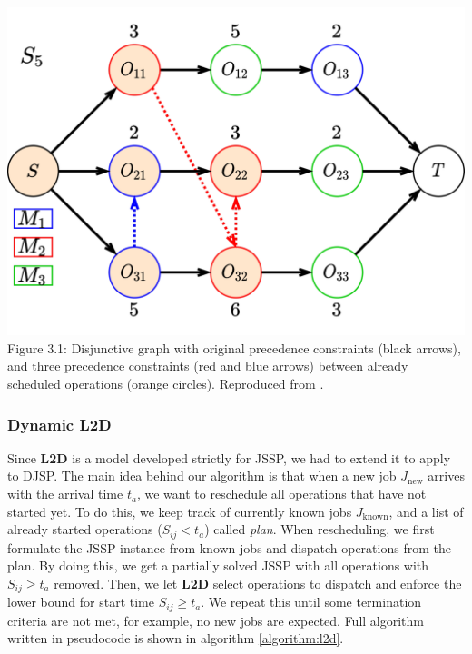 \begin{center}
    \includegraphics[width=0.75\linewidth]{images/jssp_adding_arcs.pdf}\\
    Figure 3.1: Disjunctive graph with original precedence constraints (black arrows), and three precedence constraints (red and blue arrows) between already scheduled operations (orange circles). Reproduced from \cite{zhang2020learning}.
\end{center}

\subsubsection{Dynamic L2D}

Since \textbf{L2D} is a model developed strictly for JSSP, we had to extend it to apply to DJSP. The main idea behind our algorithm is that when a new job $J_\text{new}$ arrives with the arrival time $t_a$, we want to reschedule all operations that have not started yet. To do this, we keep track of currently known jobs $J_\text{known}$, and a list of already started operations ($S_{ij} < t_a$) called \textit{plan}. When rescheduling, we first formulate the JSSP instance from known jobs and dispatch operations from the plan. By doing this, we get a partially solved JSSP with all operations with $S_{ij} \geq t_a$ removed. Then, we let \textbf{L2D} select operations to dispatch and enforce the lower bound for start time $S_{ij} \geq  t_a$. We repeat this until some termination criteria are not met, for example, no new jobs are expected. Full algorithm written in pseudocode is shown in algorithm \ref{algorithm:l2d}.

